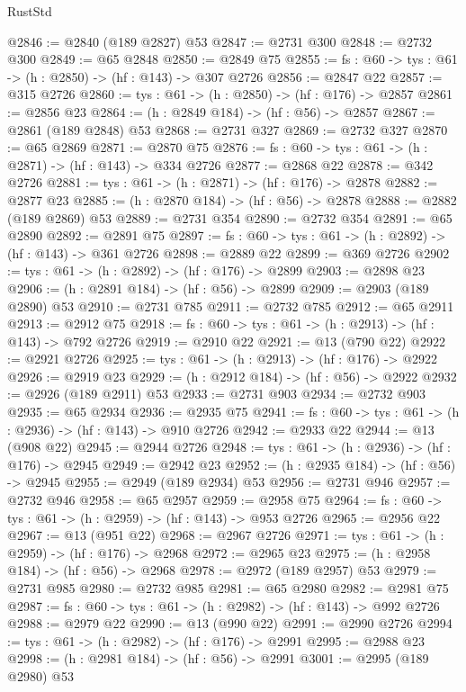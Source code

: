 \begin{lexlean}{RustStd}
\begin{coremodule}
@2846 := @2840 (@189 @2827) @53
@2847 := @2731 @300
@2848 := @2732 @300
@2849 := @65 @2848
@2850 := @2849 @75
@2855 := {fs : @60} -> {tys : @61} -> (h : @2850) -> (hf : @143) -> @307 @2726
@2856 := @2847 @22
@2857 := @315 @2726
@2860 := {tys : @61} -> (h : @2850) -> (hf : @176) -> @2857
@2861 := @2856 @23
@2864 := (h : @2849 @184) -> (hf : @56) -> @2857
@2867 := @2861 (@189 @2848) @53
@2868 := @2731 @327
@2869 := @2732 @327
@2870 := @65 @2869
@2871 := @2870 @75
@2876 := {fs : @60} -> {tys : @61} -> (h : @2871) -> (hf : @143) -> @334 @2726
@2877 := @2868 @22
@2878 := @342 @2726
@2881 := {tys : @61} -> (h : @2871) -> (hf : @176) -> @2878
@2882 := @2877 @23
@2885 := (h : @2870 @184) -> (hf : @56) -> @2878
@2888 := @2882 (@189 @2869) @53
@2889 := @2731 @354
@2890 := @2732 @354
@2891 := @65 @2890
@2892 := @2891 @75
@2897 := {fs : @60} -> {tys : @61} -> (h : @2892) -> (hf : @143) -> @361 @2726
@2898 := @2889 @22
@2899 := @369 @2726
@2902 := {tys : @61} -> (h : @2892) -> (hf : @176) -> @2899
@2903 := @2898 @23
@2906 := (h : @2891 @184) -> (hf : @56) -> @2899
@2909 := @2903 (@189 @2890) @53
@2910 := @2731 @785
@2911 := @2732 @785
@2912 := @65 @2911
@2913 := @2912 @75
@2918 := {fs : @60} -> {tys : @61} -> (h : @2913) -> (hf : @143) -> @792 @2726
@2919 := @2910 @22
@2921 := @13 (@790 @22)
@2922 := @2921 @2726
@2925 := {tys : @61} -> (h : @2913) -> (hf : @176) -> @2922
@2926 := @2919 @23
@2929 := (h : @2912 @184) -> (hf : @56) -> @2922
@2932 := @2926 (@189 @2911) @53
@2933 := @2731 @903
@2934 := @2732 @903
@2935 := @65 @2934
@2936 := @2935 @75
@2941 := {fs : @60} -> {tys : @61} -> (h : @2936) -> (hf : @143) -> @910 @2726
@2942 := @2933 @22
@2944 := @13 (@908 @22)
@2945 := @2944 @2726
@2948 := {tys : @61} -> (h : @2936) -> (hf : @176) -> @2945
@2949 := @2942 @23
@2952 := (h : @2935 @184) -> (hf : @56) -> @2945
@2955 := @2949 (@189 @2934) @53
@2956 := @2731 @946
@2957 := @2732 @946
@2958 := @65 @2957
@2959 := @2958 @75
@2964 := {fs : @60} -> {tys : @61} -> (h : @2959) -> (hf : @143) -> @953 @2726
@2965 := @2956 @22
@2967 := @13 (@951 @22)
@2968 := @2967 @2726
@2971 := {tys : @61} -> (h : @2959) -> (hf : @176) -> @2968
@2972 := @2965 @23
@2975 := (h : @2958 @184) -> (hf : @56) -> @2968
@2978 := @2972 (@189 @2957) @53
@2979 := @2731 @985
@2980 := @2732 @985
@2981 := @65 @2980
@2982 := @2981 @75
@2987 := {fs : @60} -> {tys : @61} -> (h : @2982) -> (hf : @143) -> @992 @2726
@2988 := @2979 @22
@2990 := @13 (@990 @22)
@2991 := @2990 @2726
@2994 := {tys : @61} -> (h : @2982) -> (hf : @176) -> @2991
@2995 := @2988 @23
@2998 := (h : @2981 @184) -> (hf : @56) -> @2991
@3001 := @2995 (@189 @2980) @53

\end{coremodule}
\end{lexlean}
